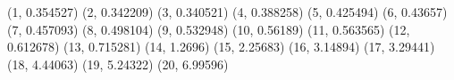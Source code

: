 (1, 0.354527) (2, 0.342209) (3, 0.340521) (4, 0.388258) (5, 0.425494) (6, 0.43657) (7, 0.457093) (8, 0.498104) (9, 0.532948) (10, 0.56189) (11, 0.563565) (12, 0.612678) (13, 0.715281) (14, 1.2696) (15, 2.25683) (16, 3.14894) (17, 3.29441) (18, 4.44063) (19, 5.24322) (20, 6.99596) 